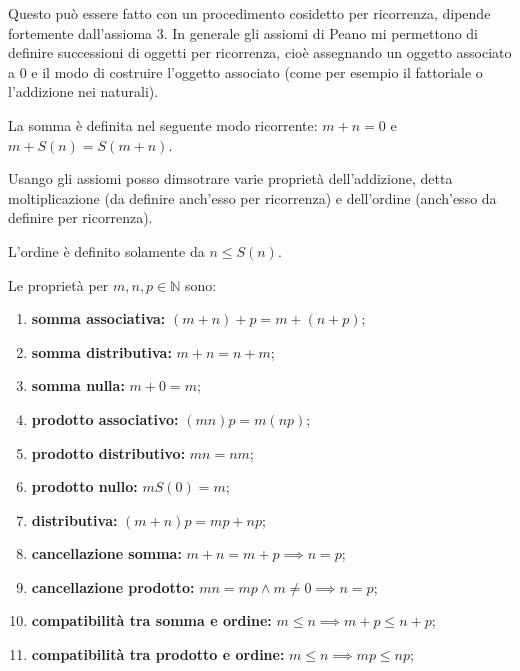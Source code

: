 \documentclass[a4paper]{article}
\begin{document}
\begin{center}
\end{center}

Questo può essere fatto con un procedimento cosidetto per ricorrenza, dipende fortemente
dall'assioma 3. In generale gli assiomi di Peano mi permettono di definire successioni di oggetti
per ricorrenza, cioè assegnando un oggetto associato a \(0\)
e il modo di costruire l'oggetto associato (come per esempio il fattoriale o l'addizione nei naturali).

La somma è definita nel seguente modo ricorrente: \(m+n=0\) e \(m+S(n) = S(m+n)\).

Usango gli assiomi posso dimsotrare varie proprietà dell'addizione, detta moltiplicazione
(da definire anch'esso per ricorrenza) e dell'ordine (anch'esso da definire per ricorrenza).

L'ordine è definito solamente da \(n \leq S(n)\).

Le proprietà per \(m,n,p\in\mathbb{N}\) sono:
\begin{enumerate}
    \item \textbf{somma associativa:} \((m+n)+p = m + (n+p)\);
    \item \textbf{somma distributiva:} \(m + n = n + m\);
    \item \textbf{somma nulla:} \(m + 0 = m\);
    \item \textbf{prodotto associativo:} \((mn)p = m(np)\);
    \item \textbf{prodotto distributivo:} \(mn = nm\);
    \item \textbf{prodotto nullo:} \(m S(0)= m\);
    \item \textbf{distributiva:} \((m+n)p = mp + np\);
    \item \textbf{cancellazione somma:} \(m+n = m+p \implies n=p\);
    \item \textbf{cancellazione prodotto:} \(mn = mp \land m \neq 0 \implies n=p\);
    \item \textbf{compatibilità tra somma e ordine:} \(m\leq n \implies m+p \leq n + p\);
    \item \textbf{compatibilità tra prodotto e ordine:} \(m\leq n \implies mp \leq np\);
\end{enumerate}
\end{document}
